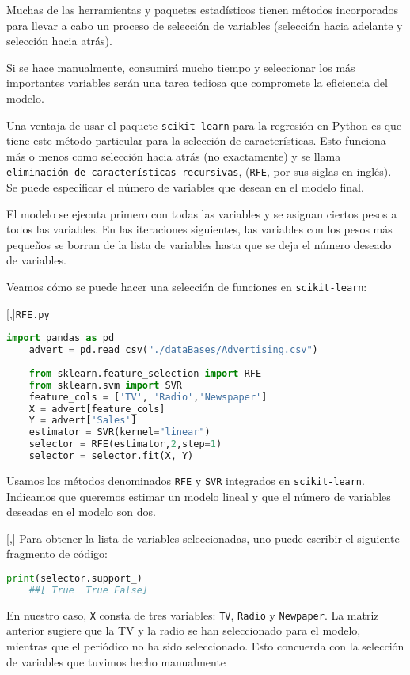 Muchas de las herramientas y paquetes estadísticos tienen métodos incorporados para
llevar a cabo un proceso de selección de variables (selección hacia adelante y selección hacia atrás).


Si
se hace manualmente, consumirá mucho tiempo y seleccionar los más importantes  variables serán una tarea tediosa que compromete la eficiencia del modelo.


Una ventaja de usar el paquete \texttt{scikit-learn} para la regresión en Python es
que tiene este método particular para la selección de características. Esto funciona más o menos como
selección hacia atrás (no exactamente) y se llama \texttt{eliminación de características recursivas}, (\texttt{RFE}, por sus siglas en inglés).
Se puede especificar el número de variables que desean en el modelo final.


El modelo se ejecuta primero con todas las variables y se asignan ciertos pesos a todos
las variables. En las iteraciones siguientes, las variables con los pesos más pequeños
se borran de la lista de variables hasta que se deja el número deseado de variables.


Veamos cómo se puede hacer una selección de funciones en \texttt{scikit-learn}:

[,]{\texttt{RFE.py}}
\begin{lstlisting}[language=Python]
	import pandas as pd
	advert = pd.read_csv("./dataBases/Advertising.csv")
	
	from sklearn.feature_selection import RFE
	from sklearn.svm import SVR
	feature_cols = ['TV', 'Radio','Newspaper']
	X = advert[feature_cols]
	Y = advert['Sales']
	estimator = SVR(kernel="linear")
	selector = RFE(estimator,2,step=1)
	selector = selector.fit(X, Y)
\end{lstlisting}


Usamos los métodos denominados \texttt{RFE} y \texttt{SVR} integrados en \texttt{scikit-learn}. Indicamos que
queremos estimar un modelo lineal y que el número de variables deseadas en el modelo son dos.

[,]{}
Para obtener la lista de variables seleccionadas, uno puede escribir el siguiente fragmento de código:
\begin{lstlisting}[language=Python]
	print(selector.support_)
	##[ True  True False]
\end{lstlisting}


En nuestro caso, \texttt{X} consta de tres variables: \texttt{TV}, \texttt{Radio} y \texttt{Newpaper}. La matriz anterior sugiere que la TV y la radio se han seleccionado para el modelo, mientras que
el periódico no ha sido seleccionado. Esto concuerda con la selección de variables que tuvimos hecho manualmente

